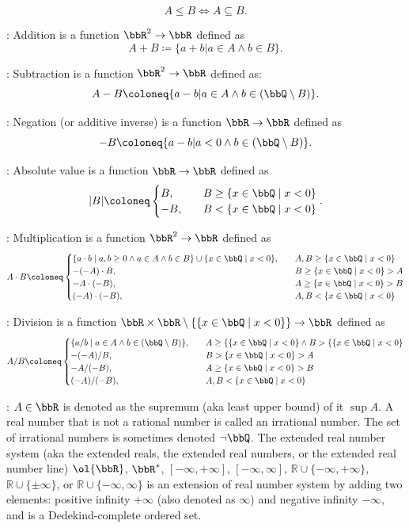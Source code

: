 \documentclass[a4paper,12pt]{article}
\begin{document}
\[A\leq B\iff A\subseteq B.\]
\item {}: Addition is a function $\bbR^2\to\bbR$ defined as
\[A+B\coloneq\{a+b|a\in A\land b\in B\}.\]
\item {}: Subtraction is a function $\bbR^2\to\bbR$ defined as:
\[A-B\coloneq\{a-b|a\in A\land b\in(\bbQ\setminus B)\}.\]
\item {}: Negation (or additive inverse) is a function $\bbR\to\bbR$ defined as
\[-B\coloneq\{a-b|a<0\land b\in(\bbQ\setminus B)\}.\]
\item {}: Absolute value is a function $\bbR\to\bbR$ defined as
\[|B|\coloneq\begin{cases}
B,\quad&B\geq\{x\in\bbQ\mid x<0\}\\
-B,\quad&B<\{x\in\bbQ\mid x<0\}
\end{cases}.\]
\item {}: Multiplication is a function $\bbR^2\to\bbR$ defined as
\[A\cdot B\coloneq\begin{cases}
\{a\cdot b\mid a,b\geq 0\land a\in A\land b\in B\}\cup\{x\in\bbQ\mid x<0\},\quad&A,B\geq\{x\in\bbQ\mid x<0\}\\
-(-A)\cdot B,\quad&B\geq\{x\in\bbQ\mid x<0\}>A\\
-A\cdot (-B),\quad&A\geq\{x\in\bbQ\mid x<0\}>B\\
(-A)\cdot (-B),\quad&A,B<\{x\in\bbQ\mid x<0\}
\end{cases}\]
\item {}: Division is a function $\bbR\times\bbR\setminus\{\{x\in\bbQ\mid x<0\}\}\to\bbR$ defined as
\[A/B\coloneq\begin{cases}
\{a/b\mid a\in A\land b\in(\bbQ\setminus B)\},\quad&A\geq\{\{x\in\bbQ\mid x<0\}\land B>\{\{x\in\bbQ\mid x<0\}\\
-(-A)/B,\quad&B>\{x\in\bbQ\mid x<0\}>A\\
-A/(-B),\quad&A\geq\{x\in\bbQ\mid x<0\}>B\\
(-A)/(-B),\quad&A,B<\{x\in\bbQ\mid x<0\}
\end{cases}\]
\item {}: $A\in\bbR$ is denoted as the supremum (aka least upper bound) of it $\sup A$.
\eit
{}
A real number that is not a rational number is called an irrational number. The set of irrational numbers is sometimes denoted $\neg\bbQ$.
The extended real number system (aka the extended reals, the extended real numbers, or the extended real number line) $\ol{\bbR}$, $\bbR^*$, $[-\infty,+\infty]$, $[-\infty,\infty]$, $\mathbb{R}\cup\{-\infty,+\infty\}$, $\mathbb{R}\cup\{\pm\infty\}$, or $\mathbb{R}\cup\{-\infty,\infty\}$ is an extension of real number system by adding two elements: positive infinity $+\infty$ (also denoted as $\infty$) and negative infinity $-\infty$, and is a Dedekind-complete ordered set.
\end{document}
